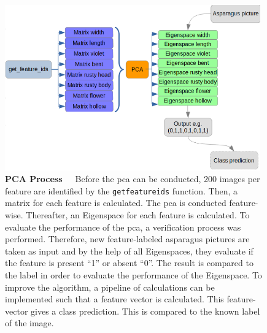\begin{figure}[!htb]
	\centering
	\includegraphics[width=0.98\textwidth]{Figures/chapter04/pca_process.png}
	\decoRule
	\caption[PCA Process]{\textbf{PCA Process}~~~Before the \acrshort{pca} can be conducted, 200 images per feature are identified by the \texttt{get\textunderscore feature\textunderscore ids} function. Then, a matrix for each feature is calculated. The \acrshort{pca} is conducted feature-wise. Thereafter, an Eigenspace for each feature is calculated. To evaluate the performance of the \acrshort{pca}, a verification process was performed. Therefore, new feature-labeled asparagus pictures are taken as input and by the help of all Eigenspaces, they evaluate if the feature is present \enquote{1} or absent \enquote{0}. The result is compared to the label in order to evaluate the performance of the Eigenspace. To improve the algorithm, a pipeline of calculations can be implemented such that a feature vector is calculated. This feature-vector gives a class prediction. This is compared to the known label of the image.}
	\label{fig:PCAprocess}
\end{figure}

